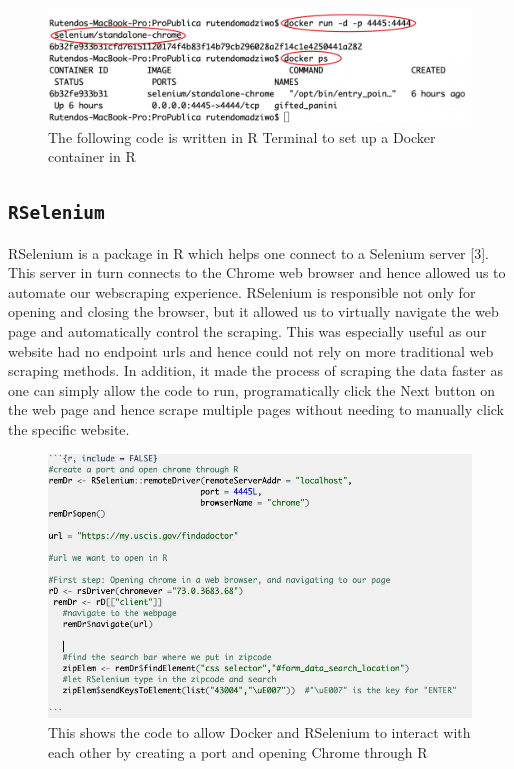\documentclass[10pt,letterpaper]{article}
\begin{document}
\begin{figure}
\includegraphics[width=1\linewidth]{docker_start} \caption{The following code is written in R Terminal to set up a Docker container in R}\label{fig:unnamed-chunk-2}
\end{figure}

\subsection{\texorpdfstring{\texttt{RSelenium}}{RSelenium}}\label{rselenium}

RSelenium is a package in R which helps one connect to a Selenium server
{[}3{]}. This server in turn connects to the Chrome web browser and
hence allowed us to automate our webscraping experience. RSelenium is
responsible not only for opening and closing the browser, but it allowed
us to virtually navigate the web page and automatically control the
scraping. This was especially useful as our website had no endpoint urls
and hence could not rely on more traditional web scraping methods. In
addition, it made the process of scraping the data faster as one can
simply allow the code to run, programatically click the Next button on
the web page and hence scrape multiple pages without needing to manually
click the specific website.

\begin{figure}
\includegraphics[width=1\linewidth]{docker_selenium} \caption{This shows the code to allow Docker and RSelenium to interact with each other by creating a port and opening Chrome through R}\label{fig:unnamed-chunk-3}
\end{figure}
\end{document}
